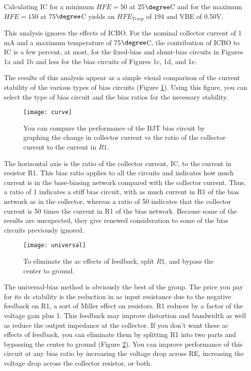  Calculating IC for a minimum $HFE=50$ at 25$\degree$C and for the maximum $HFE=150$ at 75$\degree$C yields an $HFE_{Temp}$ of 194 and VBE of 0.50V.

This analysis ignores the effects of ICBO. For the nominal collector current of 1 mA and a maximum temperature of 75$\degree$C, the contribution of ICBO to IC is a few percent, at most, for the fixed-bias and shunt-bias circuits in Figures 1a and 1b and less for the bias circuits of Figures 1c, 1d, and 1e.


The results of this analysis appear as a simple visual comparison of the current stability of the various types of bias circuits (Figure \ref{design:bjt:bias:curve}). Using this figure, you can select the type of bias circuit and the bias ratios for the necessary stability.

\begin{figure}[htbp]
\begin{center}
	\texttt{[image: curve]}
	\caption{You can compare the performance of the BJT bias circuit by graphing the change in collector current vs the ratio of the collector current to the current in $R1$.}
	\label{design:bjt:bias:curve}
\end{center}
\end{figure}


The horizontal axis is the ratio of the collector current, IC, to the current in resistor R1. This bias ratio applies to all the circuits and indicates how much current is in the base-biasing network compared with the collector current. Thus, a ratio of 1 indicates a stiff bias circuit, with as much current in R1 of the bias network as in the collector, whereas a ratio of 50 indicates that the collector current is 50 times the current in R1 of the bias network. Because some of the results are unexpected, they give renewed consideration to some of the bias circuits previously ignored.

\begin{figure}[htbp]
\begin{center}
	\texttt{[image: universal]}
	\caption{To eliminate the ac effects of feedback, split $R1$, and bypass the center to ground.}
	\label{design:bjt:bias:universal}
\end{center}
\end{figure}

The universal-bias method is obviously the best of the group. The price you pay for its dc stability is the reduction in ac input resistance due to the negative feedback on R1, a sort of Miller effect on resistors. R1 reduces by a factor of the voltage gain plus 1. This feedback may improve distortion and bandwidth as well as reduce the output impedance at the collector. If you don't want these ac effects of feedback, you can eliminate them by splitting R1 into two parts and bypassing the center to ground (Figure \ref{design:bjt:bias:universal}). You can improve performance of this circuit at any bias ratio by increasing the voltage drop across RE, increasing the voltage drop across the collector resistor, or both.

